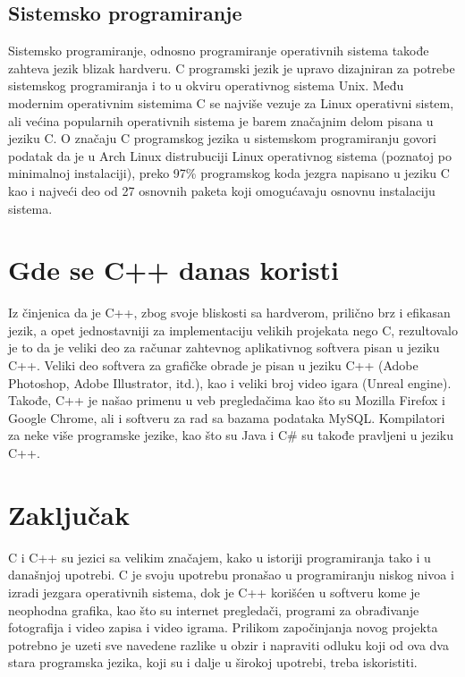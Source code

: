 \documentclass[a4paper]{article}
\begin{document}
{\subsection{Sistemsko programiranje}Sistemsko programiranje, odnosno programiranje operativnih sistema takođe zahteva jezik blizak hardveru. C programski jezik je upravo dizajniran za potrebe sistemskog programiranja i to u okviru operativnog sistema Unix. Među modernim operativnim sistemima C se najviše vezuje za Linux operativni sistem, ali većina popularnih operativnih sistema je barem značajnim delom pisana u jeziku C. O značaju C programskog jezika u sistemskom programiranju govori podatak da je u Arch Linux distrubuciji Linux operativnog sistema (poznatoj po minimalnoj instalaciji), preko 97\% programskog koda jezgra napisano u jeziku C kao i najveći deo od 27 osnovnih paketa koji omogućavaju osnovnu instalaciju sistema.

\section{Gde se C++ danas koristi}

Iz činjenica da je C++, zbog svoje bliskosti sa hardverom, prilično brz i efikasan jezik, a opet jednostavniji za implementaciju velikih projekata nego C, rezultovalo je to da je veliki deo za računar zahtevnog aplikativnog softvera pisan u jeziku C++. Veliki deo softvera za grafičke obrade je pisan u jeziku C++ (Adobe Photoshop, Adobe Illustrator, itd.), kao i veliki broj video igara (Unreal engine). Takođe, C++ je našao primenu u veb pregledačima kao što su Mozilla Firefox i Google Chrome, ali i softveru za rad sa bazama podataka MySQL. Kompilatori za neke više programske jezike, kao što su Java i C\# su takođe pravljeni u jeziku C++.

\section{Zaključak}
\label{sec:zakljucak}
C i C++ su jezici sa velikim značajem, kako u istoriji programiranja tako i u današnjoj upotrebi. C je svoju upotrebu pronašao u programiranju niskog nivoa i izradi jezgara operativnih sistema, dok je C++ korišćen u softveru kome je neophodna grafika, kao što su internet pregledači, programi za obrađivanje fotografija i video zapisa i video igrama. Prilikom započinjanja novog projekta potrebno je uzeti sve navedene razlike u obzir i napraviti odluku koji od ova dva stara programska jezika, koji su i dalje u širokoj upotrebi, treba iskoristiti.


}
\end{document}

